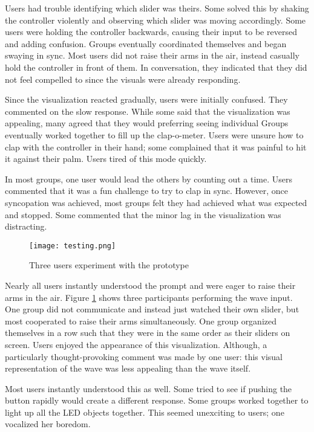 Users had trouble identifying which slider was theirs. Some solved this by shaking the controller violently and observing which slider was moving accordingly. Some users were holding the controller backwards, causing their input to be reversed and adding confusion. Groups eventually coordinated themselves and began swaying in sync. Most users did not raise their arms in the air, instead casually hold the controller in front of them. In conversation, they indicated that they did not feel compelled to since the visuals were already responding. 

Since the visualization reacted gradually, users were initially confused. They commented on the slow response. While some said that the visualization was appealing, many agreed that they would preferring seeing individual  Groups eventually worked together to fill up the clap-o-meter. Users were unsure how to clap with the controller in their hand; some complained that it was painful to hit it against their palm. Users tired of this mode quickly.

In most groups, one user would lead the others by counting out a time. Users commented that it was a fun challenge to try to clap in sync. However, once syncopation was achieved, most groups felt they had achieved what was expected and stopped. Some commented that the minor lag in the visualization was distracting.

\begin{figure}
	\centering

	\texttt{[image: testing.png]}
	\caption{Three users experiment with the prototype}

	\label{prototyping2.5}
\end{figure}

Nearly all users instantly understood the prompt and were eager to raise their arms in the air. Figure \ref{prototyping2.5} shows three participants performing the wave input. One group did not communicate and instead just watched their own slider, but most cooperated to raise their arms simultaneously. One group organized themselves in a row such that they were in the same order as their sliders on screen. Users enjoyed the appearance of this visualization. Although, a particularly thought-provoking comment was made by one user: this visual representation of the wave was less appealing than the wave itself. 

Most users instantly understood this as well. Some tried to see if pushing the button rapidly would create a different response. Some groups worked together to light up all the LED objects together. This seemed unexciting to users; one vocalized her boredom.

